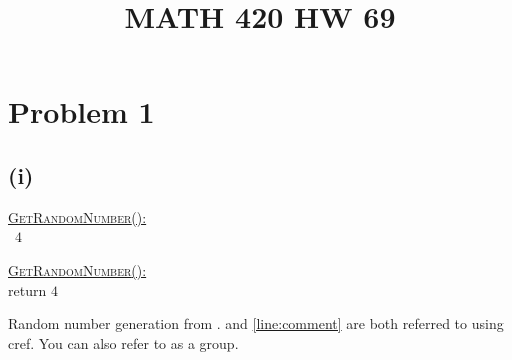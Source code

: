 \documentclass[letterpaper]{article}
\title{MATH 420 HW 69}
\begin{document}
\header

\section*{Problem 1}
\subsection*{(i)}

%

\begin{algo}
    \underline{\textsc{GetRandomNumber}():}\+
\\      \return\ $4$   
\\      \hspace{39.00pt}
\end{algo}

\begin{nalgo}[1.3]
        \underline{\textsc{GetRandomNumber}():}\+
\\\label{line:ret}  return $4$   
\\\label{line:comment}  \hspace{37.00pt}
\end{nalgo}

Random number generation from \cite{site:xkcd}.  and \cref{line:comment} are both referred to using cref. You can also refer to  as a group.
\end{document}
